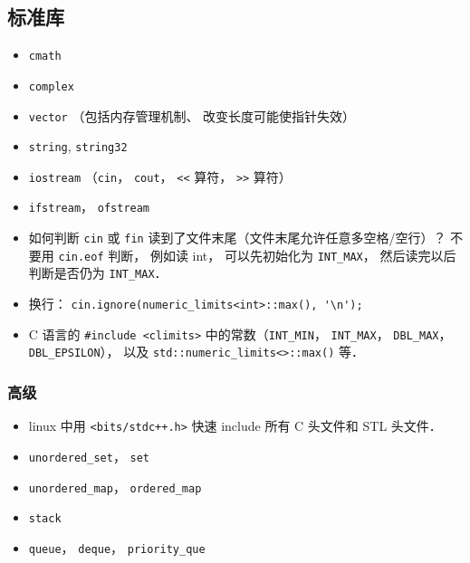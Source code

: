 \subsection{标准库}
\begin{itemize}
\item \verb|cmath|
\item \verb|complex|
\item \verb|vector| （包括内存管理机制、 改变长度可能使指针失效）
\item \verb|string|, \verb|string32|
\item \verb|iostream| （\verb|cin|， \verb|cout|， \verb|<<| 算符， \verb|>>| 算符）
\item \verb|ifstream|， \verb|ofstream|
\item 如何判断 \verb|cin| 或 \verb|fin| 读到了文件末尾（文件末尾允许任意多空格/空行）？ 不要用 \verb|cin.eof| 判断， 例如读 int， 可以先初始化为 \verb|INT_MAX|， 然后读完以后判断是否仍为 \verb|INT_MAX|．
\item 换行： \verb|cin.ignore(numeric_limits<int>::max(), '\n');|
\item C 语言的 \verb|#include <climits>| 中的常数（\verb|INT_MIN|， \verb|INT_MAX|， \verb|DBL_MAX|， \verb|DBL_EPSILON|）， 以及 \verb|std::numeric_limits<>::max()| 等．
\end{itemize}

\subsubsection{高级}
\begin{itemize}
\item linux 中用 \verb|<bits/stdc++.h>| 快速 include 所有 C 头文件和 STL 头文件．
\item \verb|unordered_set|， \verb|set|
\item \verb|unordered_map|， \verb|ordered_map|
\item \verb|stack|
\item \verb|queue|， \verb|deque|， \verb|priority_que|
\end{itemize}

